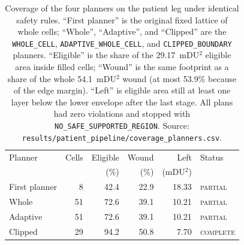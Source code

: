 \documentclass[conference]{IEEEtran}
\begin{document}
\begin{table}[t]
\caption{Coverage of the four planners on the patient leg under identical
safety rules. ``First planner'' is the original fixed lattice of whole
cells; ``Whole'', ``Adaptive'', and ``Clipped'' are the
\texttt{WHOLE\_CELL}, \texttt{ADAPTIVE\_WHOLE\_CELL}, and
\texttt{CLIPPED\_BOUNDARY} planners. ``Eligible'' is the share of the
29.17~mDU$^2$ eligible area
inside filled cells; ``Wound'' is the same footprint as a share of the
whole 54.1~mDU$^2$ wound (at most 53.9\% because of the edge margin).
``Left'' is eligible area still at least one layer below the lower envelope
after the last stage. All plans had zero violations and stopped with
\texttt{NO\_SAFE\_SUPPORTED\_REGION}. Source:
\texttt{results/patient\_pipeline/coverage\_planners.csv}.}
\label{tab:coverage}
\footnotesize
\begin{tabularx}{\columnwidth}{@{}Xrrrrl@{}}
\toprule
Planner & Cells & Eligible & Wound & Left & Status \\
 & & (\%) & (\%) & (mDU$^2$) & \\
\midrule
First planner & 8 & 42.4 & 22.9 & 18.33 & \textsc{partial} \\
Whole & 51 & 72.6 & 39.1 & 10.21 & \textsc{partial} \\
Adaptive & 51 & 72.6 & 39.1 & 10.21 & \textsc{partial} \\
Clipped & 29 & 94.2 & 50.8 & 7.70 & \textsc{complete} \\
\bottomrule
\end{tabularx}
\end{table}
\end{document}
